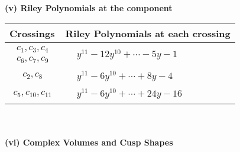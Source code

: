 \documentclass[1p]{elsarticle_modified}
\theoremstyle{definition}
\begin{document}
\newpage\renewcommand{\arraystretch}{1}
\flushleft \textbf{(v) Riley Polynomials at the component}\newline \\
\begin{tabular}{m{50pt}|m{274pt}}
Crossings & \hspace{64pt}Riley Polynomials at each crossing \\
\hline $$\begin{aligned}c_{1},c_{3},c_{4}\\c_{6},c_{7},c_{9}\end{aligned}$$&$\begin{aligned}
&y^{11}-12 y^{10}+\cdots-5 y-1
\end{aligned}$\\
\hline $$\begin{aligned}c_{2},c_{8}\end{aligned}$$&$\begin{aligned}
&y^{11}-6 y^{10}+\cdots+8 y-4
\end{aligned}$\\
\hline $$\begin{aligned}c_{5},c_{10},c_{11}\end{aligned}$$&$\begin{aligned}
&y^{11}-6 y^{10}+\cdots+24 y-16
\end{aligned}$\\
\hline
\end{tabular}\\~\\
\newpage\flushleft \textbf{(vi) Complex Volumes and Cusp Shapes}
\end{document}
